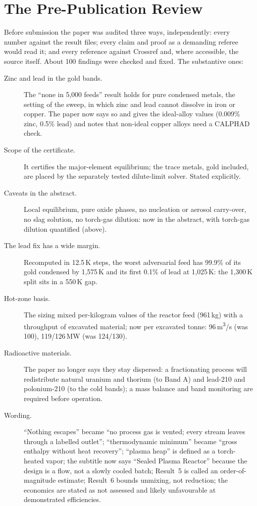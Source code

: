\documentclass[11pt,a4paper]{article}
\begin{document}
\section{The Pre-Publication Review}\label{ch:review}
Before submission the paper was audited three ways, independently: every number against the result files; every claim and proof as a demanding referee would read it; and every reference against Crossref and, where accessible, the source itself. About 100 findings were checked and fixed. The substantive ones:
\begin{description}
\item[Zinc and lead in the gold bands.] The ``none in 5,000 feeds'' result holds for pure condensed metals, the setting of the sweep, in which zinc and lead cannot dissolve in iron or copper. The paper now says so and gives the ideal-alloy values (0.009\% zinc, 0.5\% lead) and notes that non-ideal copper alloys need a CALPHAD check.
\item[Scope of the certificate.] It certifies the major-element equilibrium; the trace metals, gold included, are placed by the separately tested dilute-limit solver. Stated explicitly.
\item[Caveats in the abstract.] Local equilibrium, pure oxide phases, no nucleation or aerosol carry-over, no slag solution, no torch-gas dilution: now in the abstract, with torch-gas dilution quantified (above).
\item[The lead fix has a wide margin.] Recomputed in 12.5\,K steps, the worst adversarial feed has 99.9\% of its gold condensed by 1,575\,K and its first 0.1\% of lead at 1,025\,K: the 1,300\,K split sits in a 550\,K gap.
\item[Hot-zone basis.] The sizing mixed per-kilogram values of the reactor feed (961\,kg) with a throughput of excavated material; now per excavated tonne: 96\,m\textsuperscript{3}/s (was 100), 119/126\,MW (was 124/130).
\item[Radioactive materials.] The paper no longer says they stay dispersed: a fractionating process will redistribute natural uranium and thorium (to Band A) and lead-210 and polonium-210 (to the cold bands); a mass balance and band monitoring are required before operation.
\item[Wording.] ``Nothing escapes'' became ``no process gas is vented; every stream leaves through a labelled outlet''; ``thermodynamic minimum'' became ``gross enthalpy without heat recovery''; ``plasma heap'' is defined as a torch-heated vapor; the subtitle now says ``Sealed Plasma Reactor'' because the design is a flow, not a slowly cooled batch; Result~5 is called an order-of-magnitude estimate; Result~6 bounds unmixing, not reduction; the economics are stated as not assessed and likely unfavourable at demonstrated efficiencies.

\end{description}
\end{document}
